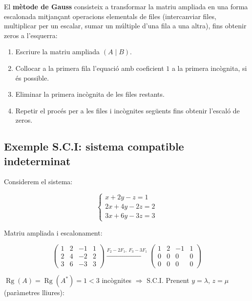 El \textbf{mètode de Gauss} consisteix a transformar la matriu ampliada en una forma escalonada mitjançant operacions elementals de files (intercanviar files, multiplicar per un escalar, sumar un múltiple d'una fila a una altra), fins obtenir zeros a l'esquerra:

\begin{enumerate}
\item Escriure la matriu ampliada $(A \mid B)$.
\item Col\textperiodcentered{}locar a la primera fila l'equació amb coeficient $1$ a la primera incògnita, si és possible.
\item Eliminar la primera incògnita de les files restants.
\item Repetir el procés per a les files i incògnites següents fins obtenir l'escaló de zeros.
\end{enumerate}

\subsection{Exemple S.C.I: sistema compatible indeterminat}

Considerem el sistema:

\begin{equation*}
\begin{cases} x + 2y - z = 1 \\ 2x + 4y - 2z = 2 \\ 3x + 6y - 3z = 3 \end{cases}
\end{equation*}

Matriu ampliada i escalonament:

\begin{equation*}
\left(\begin{array}{ccc|c} 1 & 2 & -1 & 1 \\ 2 & 4 & -2 & 2 \\ 3 & 6 & -3 & 3 \end{array}\right) \xrightarrow{F_2 - 2F_1,\; F_3 - 3F_1} \left(\begin{array}{ccc|c} 1 & 2 & -1 & 1 \\ 0 & 0 & 0 & 0 \\ 0 & 0 & 0 & 0 \end{array}\right)
\end{equation*}

$\operatorname{Rg}(A) = \operatorname{Rg}(A^*) = 1 < 3$ incògnites $\Rightarrow$ S.C.I. Prenent $y = \lambda$, $z = \mu$ (paràmetres lliures):

